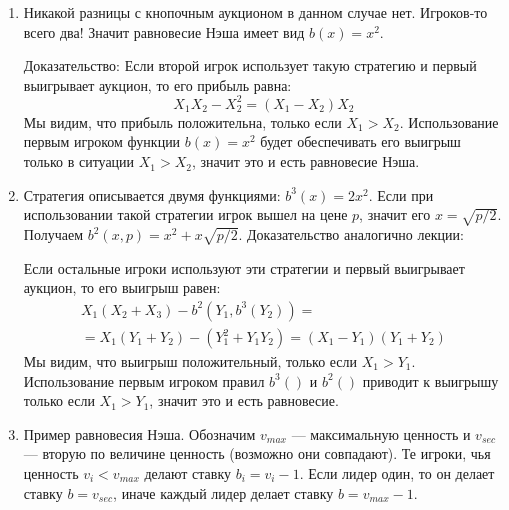 \begin{enumerate}
\item  Никакой разницы с кнопочным аукционом в данном случае нет. Игроков-то всего два! Значит равновесие Нэша имеет вид $ b(x)=x^{2} $.

Доказательство:
Если второй игрок использует такую стратегию и первый выигрывает аукцион, то его прибыль равна:
\begin{equation}
X_{1}X_{2}-X_{2}^{2}=(X_{1}-X_{2})X_{2}
\end{equation}
Мы видим, что прибыль положительна, только если $ X_{1}>X_{2} $. Использование первым игроком функции $ b(x)=x^{2} $ будет обеспечивать его выигрыш только в ситуации $ X_{1}>X_{2} $, значит это и есть равновесие Нэша.


\item Стратегия описывается двумя функциями: $ b^{3}(x)=2x^{2} $. Если при использовании такой стратегии игрок вышел на цене $ p $, значит его $ x=\sqrt{p/2} $. Получаем $ b^{2}(x,p)=x^{2}+x\sqrt{p/2}$. Доказательство аналогично лекции:

Если остальные игроки используют эти стратегии и первый выигрывает аукцион, то его выигрыш равен:
\begin{multline}
X_{1}(X_{2}+X_{3})-b^{2}(Y_{1},b^{3}(Y_{2}))=\\
=X_{1}(Y_{1}+Y_{2})-(Y_{1}^{2}+Y_{1}Y_{2})=(X_{1}-Y_{1})(Y_{1}+Y_{2})
\end{multline}
Мы видим, что выигрыш положительный, только если $ X_{1}>Y_{1} $. Использование первым игроком правил $ b^{3}() $ и $ b^{2}() $ приводит к выигрышу только если $ X_{1}>Y_{1} $, значит это и есть равновесие.


\item  Пример равновесия Нэша. Обозначим $ v_{max} $ — максимальную ценность и $ v_{sec} $ — вторую по величине ценность (возможно они совпадают). Те игроки, чья ценность $ v_{i}<v_{max} $ делают ставку $ b_{i}=v_{i}-1 $. Если лидер один, то он делает ставку $ b=v_{sec} $, иначе каждый лидер делает ставку $ b=v_{max}-1 $.


\end{enumerate}
